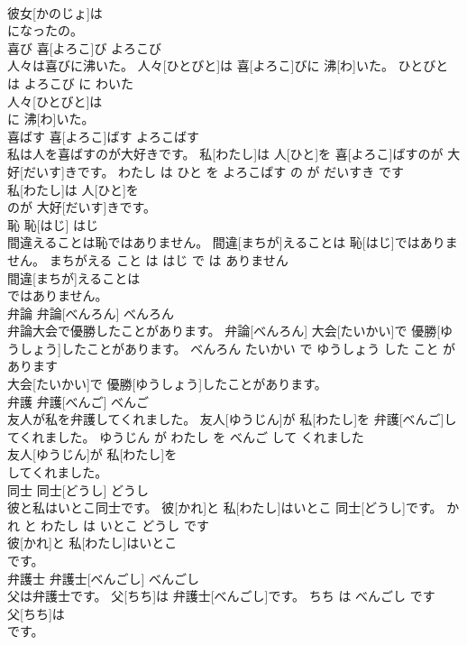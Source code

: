 \documentclass[8pt]{extreport}
\begin{document}
\begin{CJK}{UTF8}{min}
\\	彼女[かのじょ]は
\\	になったの。			
\\	喜び	喜[よろこ]び	よろこび	
\\	人々は喜びに沸いた。	人々[ひとびと]は 喜[よろこ]びに 沸[わ]いた。	ひとびと は よろこび に わいた	
\\	人々[ひとびと]は
\\	に 沸[わ]いた。			
\\	喜ばす	喜[よろこ]ばす	よろこばす	
\\	私は人を喜ばすのが大好きです。	私[わたし]は 人[ひと]を 喜[よろこ]ばすのが 大好[だいす]きです。	わたし は ひと を よろこばす の が だいすき です	
\\	私[わたし]は 人[ひと]を
\\	のが 大好[だいす]きです。			
\\	恥	恥[はじ]	はじ	
\\	間違えることは恥ではありません。	間違[まちが]えることは 恥[はじ]ではありません。	まちがえる こと は はじ で は ありません	
\\	間違[まちが]えることは
\\	ではありません。			
\\	弁論	弁論[べんろん]	べんろん	
\\	弁論大会で優勝したことがあります。	弁論[べんろん] 大会[たいかい]で 優勝[ゆうしょう]したことがあります。	べんろん たいかい で ゆうしょう した こと が あります	
\\	大会[たいかい]で 優勝[ゆうしょう]したことがあります。			
\\	弁護	弁護[べんご]	べんご	
\\	友人が私を弁護してくれました。	友人[ゆうじん]が 私[わたし]を 弁護[べんご]してくれました。	ゆうじん が わたし を べんご して くれました	
\\	友人[ゆうじん]が 私[わたし]を
\\	してくれました。			
\\	同士	同士[どうし]	どうし	
\\	彼と私はいとこ同士です。	彼[かれ]と 私[わたし]はいとこ 同士[どうし]です。	かれ と わたし は いとこ どうし です	
\\	彼[かれ]と 私[わたし]はいとこ
\\	です。			
\\	弁護士	弁護士[べんごし]	べんごし	
\\	父は弁護士です。	父[ちち]は 弁護士[べんごし]です。	ちち は べんごし です	
\\	父[ちち]は
\\	です。			

\end{CJK}
\end{document}
